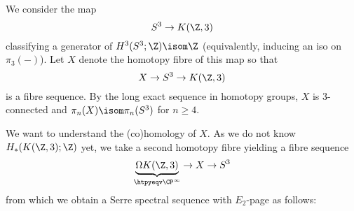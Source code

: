 \begin{example}\label{expl:postnikov_section_s_3}
	We consider the map
	\begin{equation*}
		S^3 \to K(\Z, 3)
	\end{equation*}
	classifying a generator of $H^3(S^3; \Z) \isom \Z$ (equivalently, inducing an iso on $\pi_3({{-}})$).
	Let $X$ denote the homotopy fibre of this map so that 
	\begin{equation*}
		X \to S^3 \to K(\Z, 3)
	\end{equation*}
	is a fibre sequence.
	By the long exact sequence in homotopy groups, $X$ is 3-connected and $\pi_n(X) \isom \pi_n(S^3)$ for $n \geq 4$. 

	We want to understand the (co)homology of $X$.
	As we do not know $H_*(K(\Z, 3); \Z)$ yet, we take a second homotopy fibre yielding a fibre sequence
	\begin{equation*}
		\underbrace{\Omega K(\Z, 3)}_{\htpyeqv \CP^\infty} \to X \to S^3
	\end{equation*}
	from which we obtain a Serre spectral sequence with $E_2$-page as follows:
	\begin{center}
\end{center}
\end{example}

